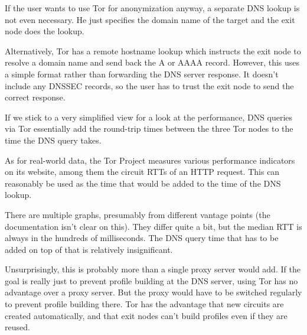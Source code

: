 If the user wants to use Tor for anonymization anyway, a separate DNS lookup is
not even necessary. He just specifies the domain name of the target and the exit
node does the lookup.

Alternatively, Tor has a remote hostname lookup which instructs the exit node to
resolve a domain name and send back the A or AAAA record. However, this uses a
simple format rather than forwarding the DNS server response. It doesn't include
any DNSSEC records, so the user has to trust the exit node to send the correct
response.

If we stick to a very simplified view for a look at the performance, DNS queries
via Tor essentially add the round-trip times between the three Tor nodes to the
time the DNS query takes.

As for real-world data, the Tor Project measures various performance indicators
on its website\cite{torperf}, among them the circuit RTTs of an HTTP request.
This can reasonably be used as the time that would be added to the time of the
DNS lookup.

There are multiple graphs, presumably from different vantage points (the
documentation isn't clear on this). They differ quite a bit, but the median RTT
is always in the hundreds of milliseconds. The DNS query time that has to be
added on top of that is relatively insignificant.

Unsurprisingly, this is probably more than a single proxy server would add. If
the goal is really just to prevent profile building at the DNS server, using Tor
has no advantage over a proxy server. But the proxy would have to be switched
regularly to prevent profile building there. Tor has
the advantage that new circuits are created automatically, and that exit nodes
can't build profiles even if they are reused.
